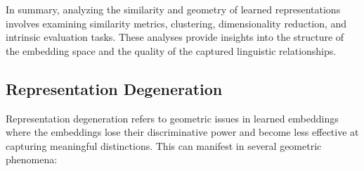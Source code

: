 In summary, analyzing the similarity and geometry of learned representations involves examining similarity metrics, clustering, dimensionality reduction, and intrinsic evaluation tasks. These analyses provide insights into the structure of the embedding space and the quality of the captured linguistic relationships.


\subsection{Representation Degeneration}

Representation degeneration refers to geometric issues in learned embeddings where the embeddings lose their discriminative power and become less effective at capturing meaningful distinctions. This can manifest in several geometric phenomena:

